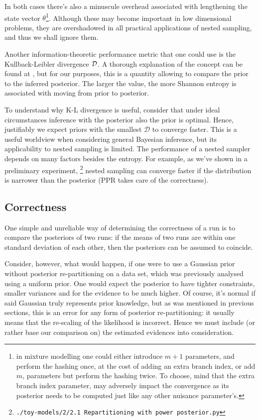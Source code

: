 \documentclass[usenatbib]{mnras}
\begin{document}
In both cases there's also a minuscule overhead associated with
lengthening the state vector \(\theta\)\footnote{in mixture modelling one could either introduce \(m+1\)
parameters, and perform the hashing once, at the cost of adding an
extra branch index, or add \(m\), parameters but perform the hashing
twice. To choose, mind that the extra branch index parameter, may
adversely impact the convergence as its posterior needs to be computed
just like any other nuisance parameter's.}.  Although these may
become important in low dimensional problems, they are overshadowed
in all practical applications of nested sampling, and thus we shall
ignore them.

Another information-theoretic performance metric that one could use
is the Kullback-Leibler divergence \({\cal D}\). A thorough
explanation of the concept can be found at \cite{Kullback_1951}, but
for our purposes, this is a quantity allowing to compare the prior
to the inferred posterior. The larger the value, the more Shannon
entropy is associated with moving from prior to posterior. 

To understand why K-L divergence is useful, consider that under
ideal circumstances inference with the posterior also the prior is
optimal. Hence, justifiably we expect priors with the smallest
\(\mathcal{D}\) to converge faster. This is a useful worldview when
considering general Bayesian inference, but its applicability to
nested sampling is limited. The performance of a nested sampler
depends on many factors besides the entropy. For example, as we've
shown in a preliminary experiment, \footnote{\texttt{./toy-models/2/2.1 Repartitioning with power posterior.py}} nested sampling can
converge faster if the distribution is narrower than the posterior
(PPR takes care of the correctness). 



\subsection{Correctness}
\label{sec:orgfebde82}
One simple and unreliable way of determining the correctness of a
run is to compare the posteriors of two runs: if the means of two
runs are within one standard deviation of each other, then the
posteriors can be assumed to coincide.

Consider, however, what would happen, if one were to use a Gaussian
prior without posterior re-partitioning on a data set, which was
previously analysed using a uniform prior. One would expect the
posterior to have tighter constraints, smaller variances and for
the evidence to be much higher. Of course, it's normal if said
Gaussian truly represents prior knowledge, but as was mentioned in
previous sections, this is an error for any form of posterior
re-partitioning: it usually means that the re-scaling of the
likelihood is incorrect. Hence we must include (or rather base our
comparison on) the estimated evidences into consideration.
\end{document}
